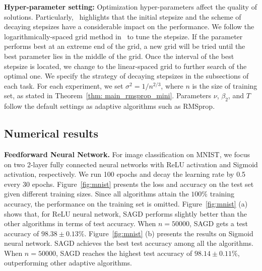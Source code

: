 \documentclass[11pt]{article}
\begin{document}
\textbf{Hyper-parameter setting:} 
Optimization hyper-parameters affect the quality of solutions. 
Particularly,~\citet{wiro17} highlights that the initial stepsize and the scheme of decaying stepsizes have a considerable impact on the performance. 
We follow the logarithmically-spaced grid method in~\citet{wiro17} to tune the stepsize. 
If the parameter performs best at an extreme end of the grid, a new grid will be tried until the best parameter lies in the middle of the grid. 
Once the interval of the best stepsize is located, we change to the linear-spaced grid to further search of the optimal one. 
We specify the strategy of decaying stepsizes in the subsections of each task. 
For each experiment, we set $\sigma^2 = 1/n^{2/3}$, where $n$ is the size of training set, as stated in Theorem~\ref{thm: main_rmsprop_mini}. 
Parameters $\nu$, $\beta_2$, and $T$ follow the default settings as adaptive algorithms such as RMSprop. 

\vspace{-0.05in}
\subsection{Numerical results}\label{subsec:results}
\vspace{-0.05in}

\textbf{Feedforward Neural Network.}
For image classification on MNIST, we focus on two 2-layer fully connected neural networks with ReLU activation and Sigmoid activation, respectively. We run 100 epochs and decay the learning rate by 0.5 every 30 epochs. 
Figure~\ref{fig:mnist} presents the loss and accuracy on the test set given different training sizes. Since all algorithms attain the $100\%$ training accuracy, the performance on the training set is omitted. 
Figure~\ref{fig:mnist} (a) shows that, for ReLU neural network, 
\textsc{SAGD} performs slightly better than the other algorithms in terms of test accuracy. When $n =50000$, \textsc{SAGD} gets a test accuracy of $98.38 \pm 0.13 \%$. 
Figure~\ref{fig:mnist} (b) presents the results on Sigmoid neural network. \textsc{SAGD} achieves the best test accuracy among all the algorithms. When $n =50000$, \textsc{SAGD} reaches the highest test accuracy of $98.14 \pm 0.11 \%$, outperforming other adaptive algorithms.
\end{document}
